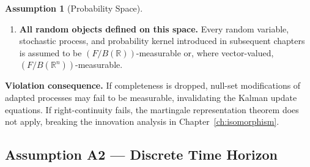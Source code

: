 \documentclass[12pt,openany]{book}
\newcommand{\calF}{\mathcal{F}}
\numberwithin{equation}{chapter}
\theoremstyle{plain}
\theoremstyle{definition}
\newtheorem{assumption}[theorem]{Assumption}
\theoremstyle{remark}
\def\mathcal#1{#1}%
\begin{document}
\begin{assumption}[Probability Space]
\begin{enumerate}[label=\textbf{A1.\arabic*.}, leftmargin=*, widest=A1.4.]
  \item \textbf{All random objects defined on this space.}
        Every random variable, stochastic process, and
        probability kernel introduced in subsequent chapters is
        assumed to be $(\calF / \mathcal{B}(\mathbb{R}))$-measurable
        or, where vector-valued, $(\calF / \mathcal{B}(\mathbb{R}^n))$-measurable.
\end{enumerate}

\noindent\textbf{Violation consequence.}  If completeness is
dropped, null-set modifications of adapted processes may fail
to be measurable, invalidating the Kalman update equations.
If right-continuity fails, the martingale representation
theorem does not apply, breaking the innovation analysis in
Chapter~\ref{ch:isomorphism}.
\end{assumption}

\subsection*{Assumption A2 — Discrete Time Horizon}
\end{document}
